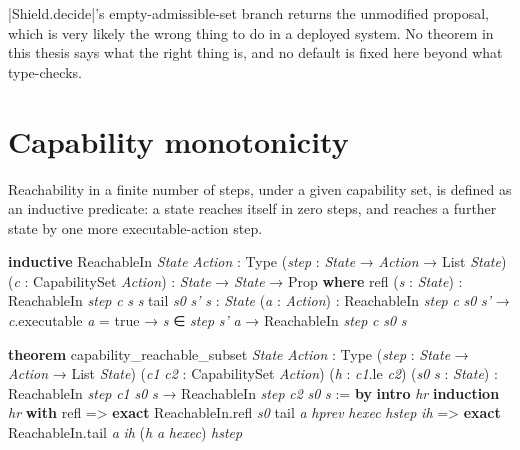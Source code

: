 \documentclass{memoir}
\begin{document}
\LeanVerb|Shield.decide|'s empty-admissible-set branch returns the unmodified
proposal, which is very likely the wrong thing to do in a deployed system.
No theorem in this thesis says what the right thing is, and no default is
fixed here beyond what type-checks.



\section{Capability monotonicity}\label{Capability--Monotonicity--in--a--Formal--Skeleton--for--Agentic--AI--Safety----The--Shield-005F-005F-005F--and--Capability--Monotonicity----Capability--monotonicity}

Reachability in a finite number of steps, under a given capability set, is
defined as an inductive predicate: a state reaches itself in zero steps, and
reaches a further state by one more executable-action step.

\begin{LeanVerbatim}
\textbf{inductive} ReachableIn \textit{State} \textit{Action} : Type (\textit{step} : \textit{State} → \textit{Action} → List \textit{State})
    (\textit{c} : CapabilitySet \textit{Action}) : \textit{State} → \textit{State} → Prop \textbf{where}
   refl (\textit{s} : \textit{State}) : ReachableIn \textit{step} \textit{c} \textit{s} \textit{s}
   tail \textit{s0} \textit{s'} \textit{s} : \textit{State} (\textit{a} : \textit{Action}) :
      ReachableIn \textit{step} \textit{c} \textit{s0} \textit{s'} →
      \textit{c}.executable \textit{a} = true →
      \textit{s} ∈ \textit{step} \textit{s'} \textit{a} →
      ReachableIn \textit{step} \textit{c} \textit{s0} \textit{s}

\textbf{theorem} capability_reachable_subset \textit{State} \textit{Action} : Type
    (\textit{step} : \textit{State} → \textit{Action} → List \textit{State})
    (\textit{c1} \textit{c2} : CapabilitySet \textit{Action}) (\textit{h} : \textit{c1}.le \textit{c2})
    (\textit{s0} \textit{s} : \textit{State}) :
    ReachableIn \textit{step} \textit{c1} \textit{s0} \textit{s} → ReachableIn \textit{step} \textit{c2} \textit{s0} \textit{s} := \textbf{by}
  \textbf{intro} \textit{hr}
  \textbf{induction} \textit{hr} \textbf{with}
   refl => \textbf{exact} ReachableIn.refl \textit{s0}
   tail \textit{a} \textit{hprev} \textit{hexec} \textit{hstep} \textit{ih} =>
      \textbf{exact} ReachableIn.tail \textit{a} \textit{ih} (\textit{h} \textit{a} \textit{hexec}) \textit{hstep}

\end{LeanVerbatim}
\end{document}

